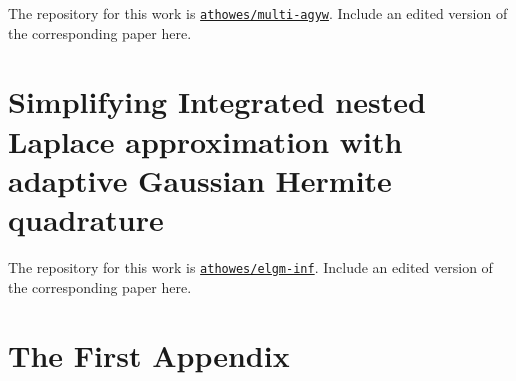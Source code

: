 \documentclass[a4paper, nobind]{templates/ociamthesis}
\newcommand*{\bibtitle}{Works Cited}
\begin{document}
The repository for this work is \href{https://github.com/athowes/multi-agyw}{\texttt{athowes/multi-agyw}}.
Include an edited version of the corresponding paper here.

\hypertarget{simplifying-integrated-nested-laplace-approximation-with-adaptive-gaussian-hermite-quadrature}{%
\chapter*{Simplifying Integrated nested Laplace approximation with adaptive Gaussian Hermite quadrature}\label{simplifying-integrated-nested-laplace-approximation-with-adaptive-gaussian-hermite-quadrature}}

\adjustmtc
{}

The repository for this work is \href{https://github.com/athowes/elgm-inf}{\texttt{athowes/elgm-inf}}.
Include an edited version of the corresponding paper here.

\startappendices

\hypertarget{the-first-appendix}{%
\chapter{The First Appendix}\label{the-first-appendix}}




\setlength{\baselineskip}{0pt} %

{\renewcommand*\MakeUppercase[1]{#1}%
\printbibliography[heading=bibintoc,title={\bibtitle}]}
\end{document}
